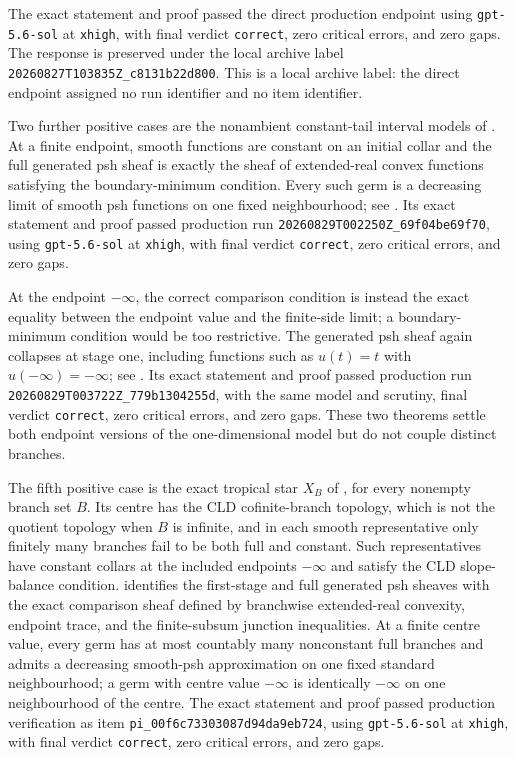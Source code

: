 The exact statement and proof passed the direct production endpoint using
\texttt{gpt-5.6-sol} at \texttt{xhigh}, with final verdict
\texttt{correct}, zero critical errors, and zero gaps.  The response is
preserved under the local archive label
\nolinkurl{20260827T103835Z_c8131b22d800}.  This is a local archive label:
the direct endpoint assigned no run identifier and no item identifier.

Two further positive cases are the nonambient constant-tail interval
models of \cite[Example~6.7.2]{CLD25}.  At a finite endpoint, smooth
functions are constant on an initial collar and the full generated psh sheaf
is exactly the sheaf of extended-real convex functions satisfying the
boundary-minimum condition.  Every such germ is a decreasing limit of smooth
psh functions on one fixed neighbourhood; see
.  Its exact statement and proof
passed production run
\nolinkurl{20260829T002250Z_69f04be69f70}, using
\texttt{gpt-5.6-sol} at \texttt{xhigh}, with final verdict
\texttt{correct}, zero critical errors, and zero gaps.

At the endpoint $-\infty$, the correct comparison condition is instead the
exact equality between the endpoint value and the finite-side limit; a
boundary-minimum condition would be too restrictive.  The generated psh
sheaf again collapses at stage one, including functions such as $u(t)=t$
with $u(-\infty)=-\infty$; see
.  Its exact statement and proof
passed production run
\nolinkurl{20260829T003722Z_779b1304255d}, with the same model and scrutiny,
final verdict \texttt{correct}, zero critical errors, and zero gaps.  These
two theorems settle both endpoint versions of the one-dimensional model but
do not couple distinct branches.

The fifth positive case is the exact tropical star $X_B$ of
\cite[\S6.7.3]{CLD25}, for every nonempty branch set $B$.  Its centre has
the CLD cofinite-branch topology, which is not the quotient topology when
$B$ is infinite, and in each smooth representative only finitely many
branches fail to be both full and constant.  Such representatives have
constant collars at the included endpoints $-\infty$ and satisfy the CLD
slope-balance condition.  
identifies the first-stage and full generated psh sheaves with the exact
comparison sheaf defined by branchwise extended-real convexity, endpoint
trace, and the finite-subsum junction inequalities.  At a finite centre
value, every germ has at most countably many nonconstant full branches and
admits a decreasing smooth-psh approximation on one fixed standard
neighbourhood; a germ with centre value $-\infty$ is identically $-\infty$
on one neighbourhood of the centre.  The exact statement and proof passed
production verification as item
\nolinkurl{pi_00f6c73303087d94da9eb724}, using
\texttt{gpt-5.6-sol} at \texttt{xhigh}, with final verdict
\texttt{correct}, zero critical errors, and zero gaps.

